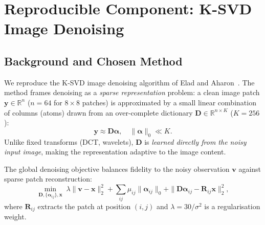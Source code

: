 

\section{Reproducible Component: K-SVD Image Denoising}

\subsection{Background and Chosen Method}

We reproduce the K-SVD image denoising algorithm of Elad and
Aharon~\cite{elad2006image}.  The method frames denoising as a
\emph{sparse representation} problem: a clean image patch
$\mathbf{y} \in \mathbb{R}^{n}$ ($n = 64$ for $8\times8$ patches)
is approximated by a small linear combination of columns (atoms)
drawn from an over-complete dictionary
$\mathbf{D} \in \mathbb{R}^{n \times K}$ ($K = 256$):
\begin{equation}
    \mathbf{y} \approx \mathbf{D}\boldsymbol{\alpha}, \quad
    \|\boldsymbol{\alpha}\|_0 \ll K.
    \label{eq:sparse}
\end{equation}
Unlike fixed transforms (DCT, wavelets), $\mathbf{D}$ is
\emph{learned directly from the noisy input image}, making the
representation adaptive to the image content.

The global denoising objective balances fidelity to the noisy
observation $\mathbf{v}$ against sparse patch reconstruction:
\begin{equation}
    \min_{\mathbf{D},\{\boldsymbol{\alpha}_{ij}\},\mathbf{x}} \;
    \lambda\|\mathbf{v}-\mathbf{x}\|_2^2 +
    \sum_{ij}\mu_{ij}\|\boldsymbol{\alpha}_{ij}\|_0 +
    \|\mathbf{D}\boldsymbol{\alpha}_{ij} -
      \mathbf{R}_{ij}\mathbf{x}\|_2^2,
    \label{eq:global}
\end{equation}
where $\mathbf{R}_{ij}$ extracts the patch at position $(i,j)$ and
$\lambda = 30/\sigma^2$ is a regularisation weight.

